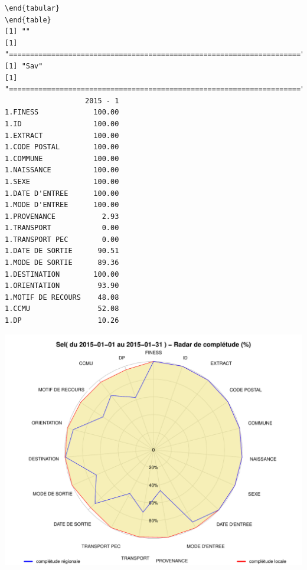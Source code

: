 \documentclass[]{article}
\begin{document}
\begin{verbatim}
\end{tabular} 
\end{table} 
[1] ""
[1] "====================================================================="
[1] "Sav"
[1] "====================================================================="
                   2015 - 1
1.FINESS             100.00
1.ID                 100.00
1.EXTRACT            100.00
1.CODE POSTAL        100.00
1.COMMUNE            100.00
1.NAISSANCE          100.00
1.SEXE               100.00
1.DATE D'ENTREE      100.00
1.MODE D'ENTREE      100.00
1.PROVENANCE           2.93
1.TRANSPORT            0.00
1.TRANSPORT PEC        0.00
1.DATE DE SORTIE      90.51
1.MODE DE SORTIE      89.36
1.DESTINATION        100.00
1.ORIENTATION         93.90
1.MOTIF DE RECOURS    48.08
1.CCMU                52.08
1.DP                  10.26
\end{verbatim}

\includegraphics{completude_files/figure-latex/finess-2.pdf}
\end{document}
